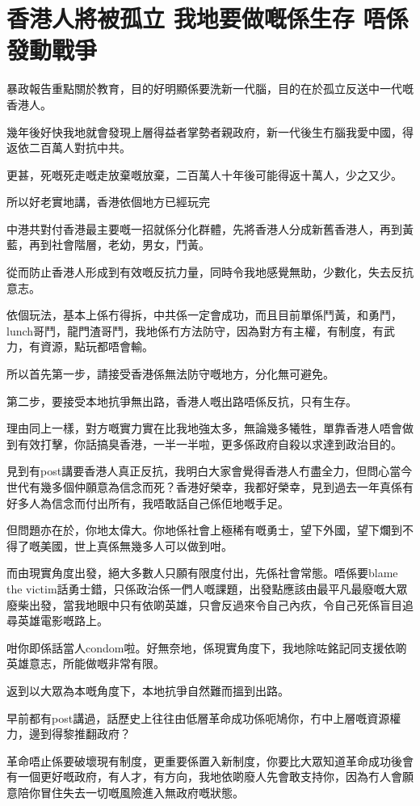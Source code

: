 \chapter{香港人將被孤立 我地要做嘅係生存 唔係發動戰爭}

暴政報告重點關於教育，目的好明顯係要洗新一代腦，目的在於孤立反送中一代嘅香港人。

幾年後好快我地就會發現上層得益者掌勢者親政府，新一代後生冇腦我愛中國，得返依二百萬人對抗中共。

更甚，死嘅死走嘅走放棄嘅放棄，二百萬人十年後可能得返十萬人，少之又少。

所以好老實地講，香港依個地方已經玩完

中港共對付香港最主要嘅一招就係分化群體，先將香港人分成新舊香港人，再到黃藍，再到社會階層，老幼，男女，鬥黃。

從而防止香港人形成到有效嘅反抗力量，同時令我地感覺無助，少數化，失去反抗意志。

依個玩法，基本上係冇得拆，中共係一定會成功，而且目前單係鬥黃，和勇鬥，lunch哥鬥，龍門渣哥鬥，我地係冇方法防守，因為對方有主權，有制度，有武力，有資源，點玩都唔會輸。

所以首先第一步，請接受香港係無法防守嘅地方，分化無可避免。

第二步，要接受本地抗爭無出路，香港人嘅出路唔係反抗，只有生存。

理由同上一樣，對方嘅實力實在比我地強太多，無論幾多犧牲，單靠香港人唔會做到有效打擊，你話搞臭香港，一半一半啦，更多係政府自殺以求達到政治目的。

見到有post講要香港人真正反抗，我明白大家會覺得香港人冇盡全力，但問心當今世代有幾多個仲願意為信念而死？香港好榮幸，我都好榮幸，見到過去一年真係有好多人為信念而付出所有，我唔敢話自己係佢地嘅手足。

但問題亦在於，你地太偉大。你地係社會上極稀有嘅勇士，望下外國，望下爛到不得了嘅美國，世上真係無幾多人可以做到咁。

而由現實角度出發，絕大多數人只願有限度付出，先係社會常態。唔係要blame the victim話勇士錯，只係政治係一們人嘅課題，出發點應該由最平凡最廢嘅大眾廢柴出發，當我地眼中只有依啲英雄，只會反過來令自己內疚，令自己死係盲目追尋英雄電影嘅路上。

咁你即係話當人condom啦。好無奈地，係現實角度下，我地除咗銘記同支援依啲英雄意志，所能做嘅非常有限。

返到以大眾為本嘅角度下，本地抗爭自然難而搵到出路。

早前都有post講過，話歷史上往往由低層革命成功係呃鳩你，冇中上層嘅資源權力，邊到得黎推翻政府？

革命唔止係要破壞現有制度，更重要係置入新制度，你要比大眾知道革命成功後會有一個更好嘅政府，有人才，有方向，我地依啲廢人先會敢支持你，因為冇人會願意陪你冒住失去一切嘅風險進入無政府嘅狀態。

